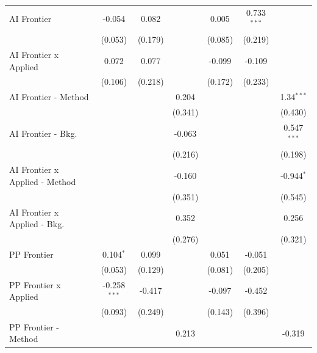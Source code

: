 \begin{tabular}{lcccccc}
   AI Frontier                    & -0.054         & 0.082       &               & 0.005   & 0.733$^{***}$ &   \\   
                                  & (0.053)        & (0.179)     &               & (0.085) & (0.219)       &   \\   
   AI Frontier x Applied          & 0.072          & 0.077       &               & -0.099  & -0.109        &   \\   
                                  & (0.106)        & (0.218)     &               & (0.172) & (0.233)       &   \\   
   AI Frontier - Method           &                &             & 0.204         &         &               & 1.34$^{***}$\\   
                                  &                &             & (0.341)       &         &               & (0.430)\\   
   AI Frontier - Bkg.             &                &             & -0.063        &         &               & 0.547$^{***}$\\   
                                  &                &             & (0.216)       &         &               & (0.198)\\   
   AI Frontier x Applied - Method &                &             & -0.160        &         &               & -0.944$^{*}$\\   
                                  &                &             & (0.351)       &         &               & (0.545)\\   
   AI Frontier x Applied - Bkg.   &                &             & 0.352         &         &               & 0.256\\   
                                  &                &             & (0.276)       &         &               & (0.321)\\   
   PP Frontier                    & 0.104$^{*}$    & 0.099       &               & 0.051   & -0.051        &   \\   
                                  & (0.053)        & (0.129)     &               & (0.081) & (0.205)       &   \\   
   PP Frontier x Applied          & -0.258$^{***}$ & -0.417      &               & -0.097  & -0.452        &   \\   
                                  & (0.093)        & (0.249)     &               & (0.143) & (0.396)       &   \\   
   PP Frontier - Method           &                &             & 0.213         &         &               & -0.319\\   

\end{tabular}
